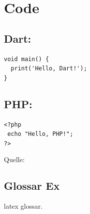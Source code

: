 \documentclass{report}
\begin{document}
\chapter{Code}

\section{Dart:}
\begin{verbatim}
void main() {
  print('Hello, Dart!');
}
\end{verbatim}

\section{PHP:}
\begin{verbatim}
<?php
 echo "Hello, PHP!";
?>
\end{verbatim}
Quelle: \cite{gugus}

\section{Glossar Ex}
\gls{latex} glossar.

\printbibliography



\printglossary
\end{document}
